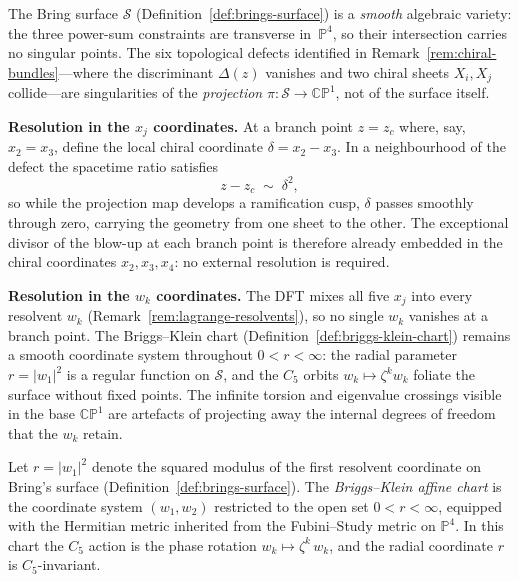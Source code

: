 \begin{remark}
\label{rem:brings-smoothness}
The Bring surface $\mathcal{S}$ (Definition~\ref{def:brings-surface}) is a
\emph{smooth} algebraic variety: the three power-sum constraints are
transverse in~$\mathbb{P}^4$, so their intersection carries no singular
points.  The six topological defects identified in
Remark~\ref{rem:chiral-bundles}---where the discriminant $\Delta(z)$
vanishes and two chiral sheets $X_i,X_j$ collide---are singularities of
the \emph{projection} $\pi\colon\mathcal{S}\to\mathbb{CP}^1$, not of the
surface itself.

\medskip
\noindent\textbf{Resolution in the $x_j$ coordinates.}\;
At a branch point $z=z_c$ where, say, $x_2=x_3$, define the local chiral
coordinate $\delta=x_2-x_3$.  In a neighbourhood of the defect the
spacetime ratio satisfies
\[
  z-z_c\;\sim\;\delta^2,
\]
so while the projection map develops a ramification cusp, $\delta$ passes
smoothly through zero, carrying the geometry from one sheet to the other.
The exceptional divisor of the blow-up at each branch point is therefore
already embedded in the chiral coordinates $x_2,x_3,x_4$: no external
resolution is required.

\medskip
\noindent\textbf{Resolution in the $w_k$ coordinates.}\;
The DFT mixes all five $x_j$ into every resolvent $w_k$
(Remark~\ref{rem:lagrange-resolvents}), so no single $w_k$ vanishes at a
branch point.  The Briggs--Klein chart
(Definition~\ref{def:briggs-klein-chart}) remains a smooth coordinate
system throughout $0<r<\infty$: the radial parameter~$r=\lvert w_1\rvert^2$
is a regular function on $\mathcal{S}$, and the $C_5$ orbits
$w_k\mapsto\zeta^k w_k$ foliate the surface without fixed points.  The
infinite torsion and eigenvalue crossings visible in the base
$\mathbb{CP}^1$ are artefacts of projecting away the internal degrees of
freedom that the $w_k$ retain.
\end{remark}

\begin{definition}
\label{def:briggs-klein-chart}
Let $r=\lvert w_1\rvert^2$ denote the squared modulus of the first resolvent
coordinate on Bring's surface
(Definition~\ref{def:brings-surface}).  The
\emph{Briggs--Klein affine chart} is the coordinate system $(w_1,w_2)$
restricted to the open set $0<r<\infty$, equipped with the Hermitian metric
inherited from the Fubini--Study metric on $\mathbb{P}^4$.  In this chart
the $C_5$ action is the phase rotation $w_k\mapsto\zeta^k\,w_k$, and the
radial coordinate $r$ is $C_5$-invariant.
\end{definition}

